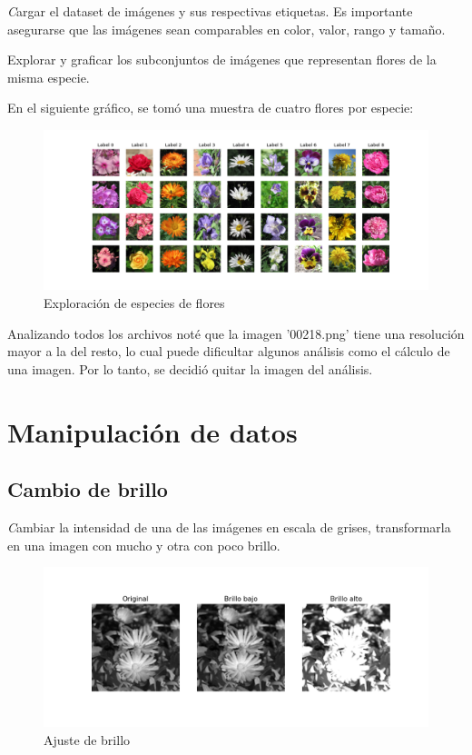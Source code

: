 \documentclass{article}
\begin{document}
{\emph Cargar el dataset de imágenes y sus respectivas etiquetas. Es importante asegurarse que las 
imágenes sean comparables en color, valor, rango y tamaño.

Explorar y graficar los subconjuntos de imágenes que representan flores de la misma
especie.}
\pagebreak

En el siguiente gráfico, se tomó una muestra de cuatro flores por especie:

\begin{figure}[h!]
  \centering  
  \includegraphics[width=1\textwidth]{1_ejemplos_flores.png}
  \caption{Exploración de especies de flores}
\end{figure}

Analizando todos los archivos noté que la imagen '00218.png'
tiene una resolución mayor a la del resto, lo cual 
puede dificultar algunos análisis como el cálculo de una imagen. Por lo tanto,
se decidió quitar la imagen del análisis.

\section{Manipulación de datos}

\subsection{Cambio de brillo}

{\emph Cambiar la intensidad de una de las imágenes en escala de grises, transformarla en una imagen con mucho y otra con poco brillo.}

\begin{figure}[h!]
  \centering    
  \includegraphics[width=1\textwidth]{2_brillo.png}
  \caption{Ajuste de brillo}
\end{figure}
\end{document}
